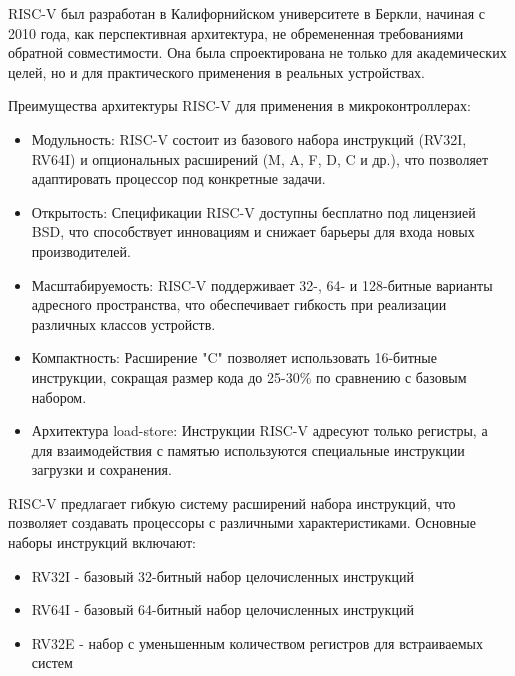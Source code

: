 
RISC-V был разработан в Калифорнийском университете в Беркли, начиная с 2010 года, как перспективная архитектура, не обремененная требованиями обратной совместимости\cite{RISC2024}. Она была спроектирована не только для академических целей, но и для практического применения в реальных устройствах.

Преимущества архитектуры RISC-V для применения в микроконтроллерах:

\begin{itemize}
	\item Модульность: RISC-V состоит из базового набора инструкций (RV32I, RV64I) и опциональных расширений (M, A, F, D, C и др.), что позволяет адаптировать процессор под конкретные задачи\cite{RISC2024}.
	\item Открытость: Спецификации RISC-V доступны бесплатно под лицензией BSD, что способствует инновациям и снижает барьеры для входа новых производителей.
	\item Масштабируемость: RISC-V поддерживает 32-, 64- и 128-битные варианты адресного пространства, что обеспечивает гибкость при реализации различных классов устройств.
	\item Компактность: Расширение "C" позволяет использовать 16-битные инструкции, сокращая размер кода до 25-30\% по сравнению с базовым набором.
	\item Архитектура load-store: Инструкции RISC-V адресуют только регистры, а для взаимодействия с памятью используются специальные инструкции загрузки и сохранения.
\end{itemize}

RISC-V предлагает гибкую систему расширений набора инструкций, что позволяет создавать процессоры с различными характеристиками. Основные наборы инструкций включают:

\begin{itemize}
	\item RV32I - базовый 32-битный набор целочисленных инструкций
	\item RV64I - базовый 64-битный набор целочисленных инструкций
	\item RV32E - набор с уменьшенным количеством регистров для встраиваемых систем
\end{itemize}

